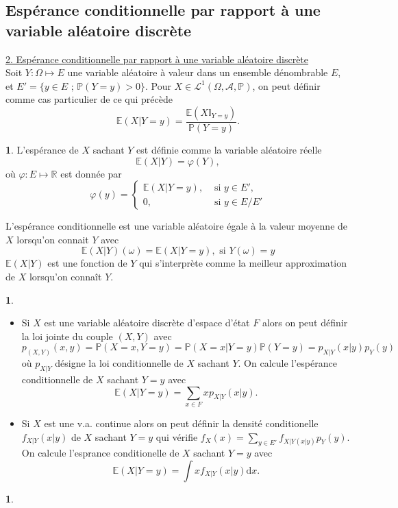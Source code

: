 \documentclass[8pt,notheorems]{beamer}
\def \E{\mathbb E}
\renewcommand{\Pr}{\mathbb{P}}
\theoremstyle{definition}
\newtheorem{definition}{\translate{Definition}}
\theoremstyle{example}
\newtheorem{example}{\translate{Exemple}}
\newtheorem{remark}{\translate{Remarque}}
\theoremstyle{mystyle}
\theoremstyle{plain}
\begin{document}
\subsection{Espérance conditionnelle par rapport à une variable aléatoire discrète}
\begin{frame}[allowframebreaks]
\underline{2. Espérance conditionnelle par rapport à une variable aléatoire discrète}\\
Soit $Y: \Omega\mapsto E$ une variable aléatoire à valeur dans un ensemble dénombrable $E$, et $E' = \{y\in E\text{ ; }\Pr(Y = y)>0\}$. Pour $X\in\mathcal{L}^1(\Omega,\mathcal{A},\Pr)$, on peut définir comme cas particulier de ce qui précède  
$$
\E(X|Y= y) = \frac{\E(X\mathbb{I}_{Y = y})}{\Pr(Y = y)}.
$$
\begin{definition}
L'espérance de $X$ sachant $Y$ est définie comme la variable aléatoire réelle 
$$
\E(X|Y) = \varphi(Y),
$$
où $\varphi:E\mapsto\mathbb{R}$ est donnée par 
$$
\varphi(y) =
\begin{cases}
\E(X|Y = y),&\text{ si }y\in E',\\
0,&\text{ si }y\in E/E'
\end{cases}
$$
\end{definition}
L'espérance conditionnelle est une variable aléatoire égale à la valeur moyenne de $X$ lorsqu'on connait $Y$ avec 
$$
\E(X|Y)(\omega) = \E(X|Y=y),\text{ si } Y(\omega)=y
$$
$\E(X|Y)$ est une fonction de $Y$ qui s'interprète comme la meilleur approximation de $X$ lorsqu'on connaît $Y$.
\begin{remark}
\begin{itemize}
    \item Si $X$ est une variable aléatoire discrète d'espace d'état $F$ alors on peut définir la loi jointe du couple $(X,Y)$ avec 
    $$
    p_{(X,Y)}(x,y) = \Pr(X = x, Y = y) = \Pr(X = x|Y = y)\Pr(Y=y) = p_{X|Y}(x|y)p_Y(y)
    $$
    où $p_{X|Y}$ désigne la loi conditionnelle de $X$ sachant $Y$. On calcule l'espérance conditionnelle de $X$ sachant $Y = y$ avec 
    $$
    \E(X|Y = y) = \sum_{x\in F}xp_{X|Y}(x|y).
    $$ 
    \item Si $X$ est une v.a. continue alors on peut définir la densité conditionelle $f_{X|Y}(x|y)$ de $X$ sachant $Y = y$ qui vérifie $f_X(x) = \sum_{y \in E'}f_{X|Y(x|y)}p_Y(y)$. On calcule l'esprance conditionelle de $X$ sachant $Y = y$ avec 
    $$
    \E(X|Y = y) = \int x f_{X|Y}(x|y)\text{d}x.
    $$
\end{itemize}
\end{remark}
\begin{example}

\end{example}
\end{frame}
\end{document}

